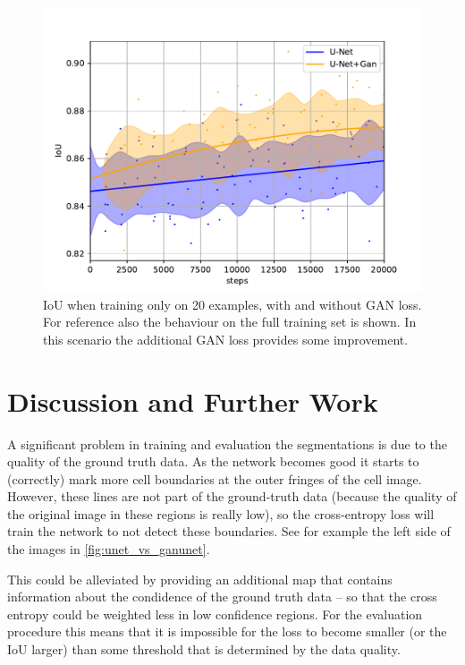 \documentclass[aps,prl,twocolumn,groupedaddress,amsmath,amssymb]{revtex4-1}
\begin{document}
    \begin{figure}[tbp]
        \begin{center}
        \includegraphics[width=\linewidth]{figures/less_data.pdf}
        \end{center}
        \caption{IoU when training only on 20 examples, with and without GAN loss. For reference
        also the behaviour on the full training set is shown. In this scenario the additional GAN
        loss provides some improvement.}
        \label{fig:reduced_data}
    \end{figure}


    \section{Discussion and Further Work}
    A significant problem in training and evaluation the segmentations is due
    to the quality of the ground truth data. As the network becomes good it
    starts to (correctly) mark more cell boundaries at the outer fringes of
    the cell image. However, these lines are not part of the ground-truth data
    (because the quality of the original image in these regions is really
    low), so the cross-entropy loss will train the network to not detect these
    boundaries. See for example the left side of the images in
    \autoref{fig:unet_vs_ganunet}.

    This could be alleviated by providing an additional map that contains
    information about the condidence of the ground truth data -- so that the
    cross entropy could be weighted less in low confidence regions. For the
    evaluation procedure this means that it is impossible for the loss to
    become smaller (or the IoU larger) than some threshold that is determined
    by the data quality.
\end{document}
